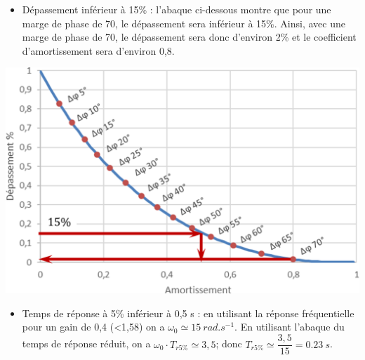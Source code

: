\documentclass[10pt,fleqn]{article} %
\begin{document}
\begin{multicols}{2}
\begin{corrige}
\begin{itemize}
\item Dépassement inférieur à 15\% : l'abaque ci-dessous montre que pour une marge de phase de 70\degres, le dépassement sera inférieur à 15\%. Ainsi, avec une marge de phase de 70\degres, le dépassement sera donc d'environ 2\% et le coefficient d'amortissement sera d'environ 0,8. 
\end{itemize}
\begin{center}
\includegraphics[width=\linewidth]{images/abaque_cor}
\end{center}
\begin{itemize}
\item Temps de réponse à 5\% inférieur à 0,5 s : en utilisant la réponse fréquentielle pour un gain de 0,4 (<1,58) on a $\omega_0\simeq \SI {15}{rad.s^{-1}}$. En utilisant l'abaque du temps de réponse réduit, on a  $\omega_0 \cdot T_{r5\%}\simeq 3,5$; donc $T_{r5\%}\simeq \dfrac{3,5}{15} = \SI{0,23}{s}$. 

\end{itemize}


\end{corrige}
\end{multicols}
\end{document}
